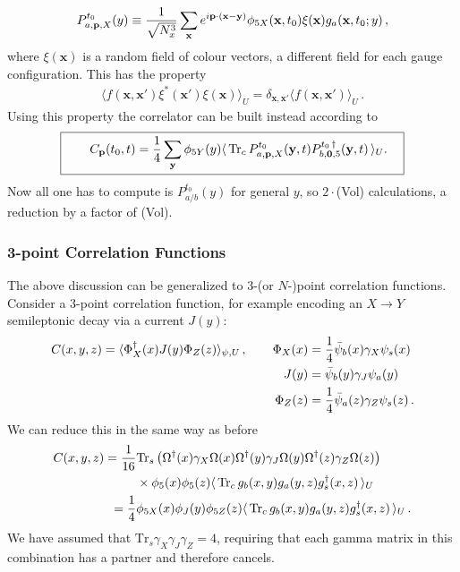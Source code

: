 \begin{align}
  P^{t_0}_{a,{\textbf{p}},X}(y) \equiv {1\over \sqrt{N_x^3}} \sum_{\textbf{x}} e^{i{\textbf{p}}\cdot ({\textbf{x}}-{\textbf{y}})} \phi_{5X}({\textbf{x}},t_0) \xi({\textbf{x}}) g_a({\textbf{x}},t_0;y)\,,
  \label{eq:onesided_prop}
\end{align}
where $\xi({\textbf{x}})$ is a random field of colour vectors, a different field for each gauge configuration. This has the property
\begin{align}
  \langle f({\textbf{x}},{\textbf{x}}') \xi^*({\textbf{x}}')\xi({\textbf{x}})\rangle_U = \delta_{{\textbf{x}},{\textbf{x}}'} \langle f({\textbf{x}},{\textbf{x}}') \rangle_U\,.
\end{align}
Using this property the correlator can be built instead according to
\begin{align}
  \boxed{\quad  \quad C_{\textbf{p}}(t_0,t) = {1\over 4} \sum_{\textbf{y}} \phi_{5Y}(y) \langle \,\text{Tr}_c \, P^{t_0}_{a,{\textbf{p}},X}({\textbf{y}},t) P^{t_0\,\dagger}_{b,{\textbf{0}},5}({\textbf{y}},t) \,\rangle_U. \quad}
  \label{eq:tietogether}
\end{align}
Now all one has to compute is $P^{t_0}_{a/b}(y)$ for general $y$, so $2\cdot$(Vol) calculations, a reduction by a factor of (Vol).

\subsubsection{3-point Correlation Functions}

The above discussion can be generalized to 3-(or $N$-)point correlation functions. Consider a 3-point correlation function, for example encoding an $X\to Y$ semileptonic decay via a current $J(y)$:
\begin{align}
  C(x,y,z) = \langle \Phi^{\dagger}_X(x) J(y) \Phi_Z(z) \rangle_{\psi,U} \,,\quad \quad \Phi_X(x) &= {1\over 4} \bar{\psi}_b(x) \gamma_X \psi_s(x) \\
  \nonumber
  J(y) &= \bar{\psi}_b(y)\gamma_J\psi_a(y) \\
  \nonumber
  \Phi_Z(z) &= {1\over 4}\bar{\psi}_a(z)\gamma_Z \psi_s(z)\,.
\end{align}
We can reduce this in the same way as before
\begin{align}
  C(x,y,z) = {1\over 16}& \text{Tr}_s\left( \Omega^{\dagger}(x) \gamma_X \Omega(x) \Omega^{\dagger}(y) \gamma_J \Omega(y) \Omega^{\dagger}(z) \gamma_Z \Omega(z) \right) \\ \nonumber &\times \phi_5(x)\phi_5(z)\langle \,\text{Tr}_c\, g_{b}(x,y) g_{a}(y,z) g^{\dagger}_{s}(x,z)\,\rangle_U \\
  = {1\over 4}& \phi_{5X}(x) \phi_J(y) \phi_{5Z}(z) \langle \,\text{Tr}_c\, g_{b}(x,y) g_{a}(y,z) g^{\dagger}_{s}(x,z) \,\rangle_U\,.
\end{align}
We have assumed that $\text{Tr}_s \gamma_X\gamma_J\gamma_Z = 4$, requiring that each gamma matrix in this combination has a partner and therefore cancels.

